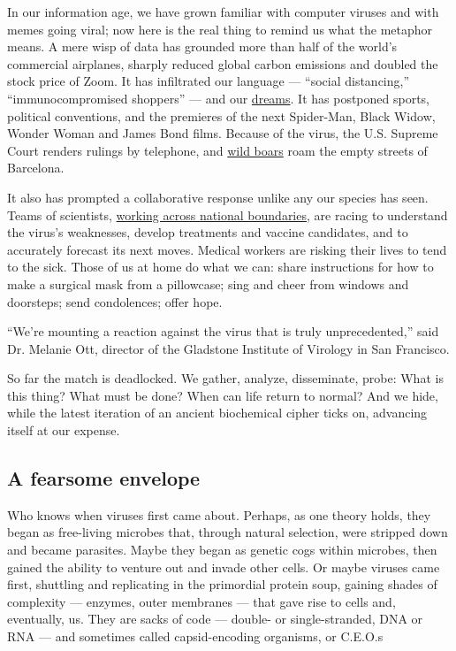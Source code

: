 In our information age, we have grown familiar with computer viruses and
with memes going viral; now here is the real thing to remind us what the
metaphor means. A mere wisp of data has grounded more than half of the
world's commercial airplanes, sharply reduced global carbon emissions
and doubled the stock price of Zoom. It has infiltrated our language ---
``social distancing,'' ``immunocompromised shoppers'' --- and our
\href{https://www.nytimes.com/2020/04/13/style/why-weird-dreams-coronavirus.html}{dreams}.
It has postponed sports, political conventions, and the premieres of the
next Spider-Man, Black Widow, Wonder Woman and James Bond films. Because
of the virus, the U.S. Supreme Court renders rulings by telephone, and
\href{https://www.nytimes.com/2020/04/17/arts/coronavirus-nature-genre.html}{wild
boars} roam the empty streets of Barcelona.

It also has prompted a collaborative response unlike any our species has
seen. Teams of scientists,
\href{https://www.nytimes.com/2020/04/01/world/europe/coronavirus-science-research-cooperation.html}{working
across national boundaries}, are racing to understand the virus's
weaknesses, develop treatments and vaccine candidates, and to accurately
forecast its next moves. Medical workers are risking their lives to tend
to the sick. Those of us at home do what we can: share instructions for
how to make a surgical mask from a pillowcase; sing and cheer from
windows and doorsteps; send condolences; offer hope.

``We're mounting a reaction against the virus that is truly
unprecedented,'' said Dr. Melanie Ott, director of the Gladstone
Institute of Virology in San Francisco.

So far the match is deadlocked. We gather, analyze, disseminate, probe:
What is this thing? What must be done? When can life return to normal?
And we hide, while the latest iteration of an ancient biochemical cipher
ticks on, advancing itself at our expense.

\hypertarget{a-fearsome-envelope}{%
\subsection{A fearsome envelope}\label{a-fearsome-envelope}}

Who knows when viruses first came about. Perhaps, as one theory holds,
they began as free-living microbes that, through natural selection, were
stripped down and became parasites. Maybe they began as genetic cogs
within microbes, then gained the ability to venture out and invade other
cells. Or maybe viruses came first, shuttling and replicating in the
primordial protein soup, gaining shades of complexity --- enzymes, outer
membranes --- that gave rise to cells and, eventually, us. They are
sacks of code --- double- or single-stranded, DNA or RNA --- and
sometimes called capsid-encoding organisms, or C.E.O.s


